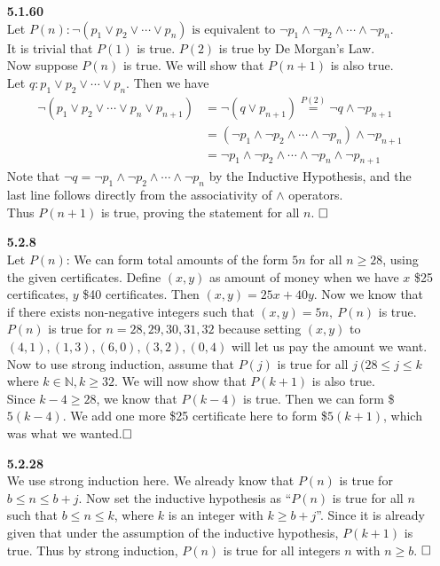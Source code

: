 \documentclass{article}
\newcommand*{\qed}{\hfill\ensuremath{\square\\}}%
\begin{document}
\begin{itemize}
\item[\large \textbf{5.1.60}] ~\\
Let \(P(n): \neg(p_1 \vee p_2 \vee \cdots \vee p_n) \text{ is equivalent to } \neg p_1 \wedge \neg p_2 \wedge \cdots \wedge \neg p_n\). \\
It is trivial that \(P(1)\) is true. \(P(2)\) is true by De Morgan's Law.\\
Now suppose \(P(n)\) is true. We will show that \(P(n+1)\) is also true.\\
Let \(q : p_1 \vee p_2 \vee \cdots \vee p_n\). Then we have
\[
\begin{aligned}
	\neg(p_1 \vee p_2 \vee \cdots \vee p_n \vee p_{n+1}) &= \neg(q \vee p_{n+1}) \overset{P(2)}{=} \neg q \wedge \neg p_{n+1}\\
	&= (\neg p_1 \wedge \neg p_2 \wedge \cdots \wedge \neg p_n) \wedge \neg p_{n+1} \\
	&= \neg p_1 \wedge \neg p_2 \wedge \cdots \wedge \neg p_n \wedge \neg p_{n+1}
\end{aligned}
\]
Note that \(\neg q = \neg p_1 \wedge \neg p_2 \wedge \cdots \wedge \neg p_n \) by the Inductive Hypothesis, and the last line follows directly from the associativity of \(\wedge\) operators.\\Thus \(P(n+1)\) is true, proving the statement for all \(n\). \qed

\item[\large \textbf{5.2.8}] ~ \\
Let \(P(n)\): We can form total amounts of the form \(5n\) for all \(n\geq 28\), using the given certificates.
Define \((x, y)\) as amount of money when we have \(x\) \$25 certificates, \(y\) \$40 certificates. Then \((x, y) = 25x + 40y\). Now we know that if there exists non-negative integers such that \((x, y) = 5n, \: P(n)\) is true.  \\
\(P(n)\) is true for \(n=28, 29, 30, 31, 32\) because setting \((x, y)\) to \((4, 1), (1, 3), (6, 0), (3, 2), (0, 4)\) will let us pay the amount we want. \\
Now to use strong induction, assume that \(P(j)\) is true for all \(j \: (28\leq j \leq k\) where \(k \in \mathbb{N}, k \geq 32\). We will now show that \(P(k+1)\) is also true. \\
Since \(k-4\geq 28\), we know that \(P(k-4)\) is true. Then we can form \$\(5(k-4)\). We add one more \$25 certificate here to form \$\(5(k+1)\), which was what we wanted.\qed


\item[\large \textbf{5.2.28}] ~\\
We use strong induction here. We already know that $P(n)$ is true for $b\leq n\leq b+j$. Now set the inductive hypothesis as ``$P(n)$ is true for all $n$ such that $b\leq n \leq k$, where $k$ is an integer with $k\geq b+j$''. Since it is already given that under the assumption of the inductive hypothesis, $P(k+1)$ is true.
Thus by strong induction, $P(n)$ is true for all integers $n$ with $n\geq b$. \qed 


\end{itemize}
\end{document}
